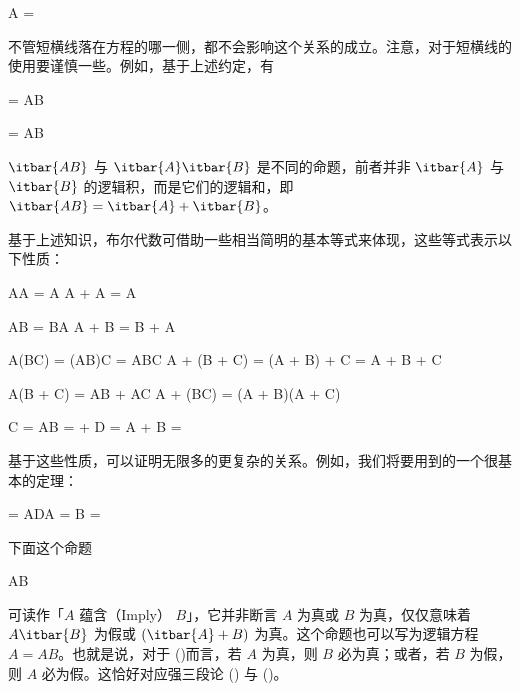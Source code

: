 \placeformula
\startformula
A = 
\stopformula

不管短横线落在方程的哪一侧，都不会影响这个关系的成立。注意，对于短横线的使用要谨慎一些。例如，基于上述约定，有

\placeformula
\startformula
{} = AB
\stopformula

\placeformula
\startformula
{} = AB
\stopformula

$\itbar{AB}$ 与 $\itbar{A}\itbar{B}$ 是不同的命题，前者并非 $\itbar{A}$ 与 $\itbar{B}$ 的逻辑积，而是它们的逻辑和，即 $\itbar{AB} = \itbar{A} + \itbar{B}$。

基于上述知识，布尔代数可借助一些相当简明的基本等式来体现，这些等式表示以下性质：

\placeformula[1-12]
\startformula
\startalign[n=2,align={left,left}]
\NC{}
\NC\quad\startmathcases
    \NC AA = A\NR
    \NC A + A = A\NR
\stopmathcases\NR

\NC{}
\NC\quad\startmathcases
    \NC AB = BA\NR
    \NC A + B = B + A\NR
\stopmathcases\NR
				   
\NC{}
\NC\quad\startmathcases
    \NC A(BC) = (AB)C = ABC\NR
    \NC A + (B + C) = (A + B) + C = A + B + C\NR
\stopmathcases\NR

\NC{}
\NC\quad\startmathcases
    \NC A(B + C) = AB + AC\NR
    \NC A + (BC) = (A + B)(A + C)\NR
\stopmathcases\NR

\NC{}
\NC\quad\startmathcases
    \NC{} C = AB  =  + \NR
    \NC {} D = A + B  = \NR
\stopmathcases\NR
\stopalign
\stopformula

基于这些性质，可以证明无限多的更复杂的关系。例如，我们将要用到的一个很基本的定理：

\placeformula[1-13]
\startformula
{} = ADA = B = 
\stopformula

\blank[big]
\blank[small]

下面这个命题

\placeformula[implication]
\startformula
A\Rightarrow B
\stopformula

可读作「$A$ 蕴含（Imply） $B$」，它并非断言 $A$ 为真或 $B$ 为真，仅仅意味着 $A\itbar{B}$ 为假或 $(\itbar{A} + B)$ 为真。这个命题也可以写为逻辑方程 $A = AB$。也就是说，对于 (\in[implication])而言，若 $A$ 为真，则 $B$ 必为真；或者，若 $B$ 为假，则 $A$ 必为假。这恰好对应强三段论 (\in[syllogism-1]) 与 (\in[syllogism-2])。

